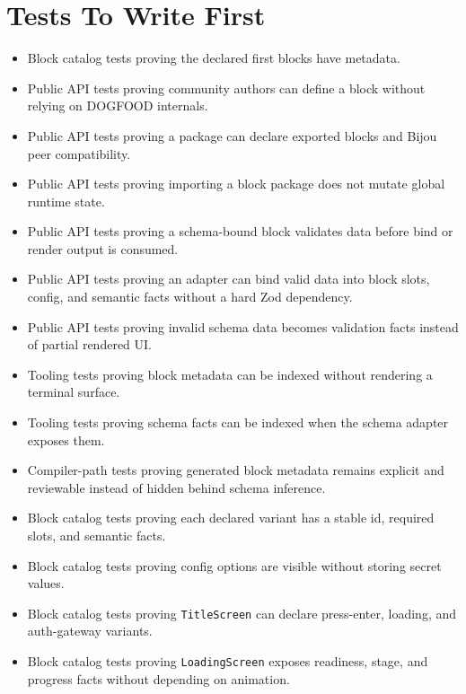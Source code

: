 \section{Tests To Write First}\label{record-128-tests-to-write-first}

\begin{itemize}
\tightlist
\item
  Block catalog tests proving the declared first blocks have metadata.
\item
  Public API tests proving community authors can define a block without relying on DOGFOOD internals.
\item
  Public API tests proving a package can declare exported blocks and Bijou peer compatibility.
\item
  Public API tests proving importing a block package does not mutate global runtime state.
\item
  Public API tests proving a schema-bound block validates data before bind or render output is consumed.
\item
  Public API tests proving an adapter can bind valid data into block slots, config, and semantic facts without a hard Zod dependency.
\item
  Public API tests proving invalid schema data becomes validation facts instead of partial rendered UI.
\item
  Tooling tests proving block metadata can be indexed without rendering a terminal surface.
\item
  Tooling tests proving schema facts can be indexed when the schema adapter exposes them.
\item
  Compiler-path tests proving generated block metadata remains explicit and reviewable instead of hidden behind schema inference.
\item
  Block catalog tests proving each declared variant has a stable id, required slots, and semantic facts.
\item
  Block catalog tests proving config options are visible without storing secret values.
\item
  Block catalog tests proving \texttt{T\allowbreak{}i\allowbreak{}t\allowbreak{}l\allowbreak{}e\allowbreak{}S\allowbreak{}c\allowbreak{}r\allowbreak{}e\allowbreak{}e\allowbreak{}n} can declare press-enter, loading, and auth-gateway variants.
\item
  Block catalog tests proving \texttt{L\allowbreak{}o\allowbreak{}a\allowbreak{}d\allowbreak{}i\allowbreak{}n\allowbreak{}g\allowbreak{}S\allowbreak{}c\allowbreak{}r\allowbreak{}e\allowbreak{}e\allowbreak{}n} exposes readiness, stage, and progress facts without depending on animation.

\end{itemize}
